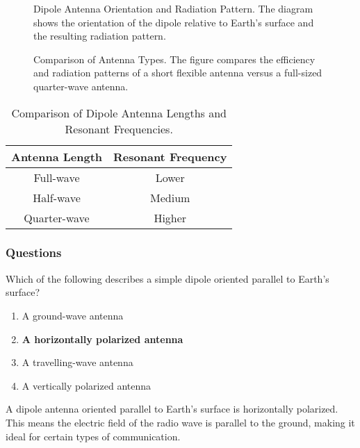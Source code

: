 \begin{figure}[h!]
    \centering
    \caption{Dipole Antenna Orientation and Radiation Pattern. The diagram shows the orientation of the dipole relative to Earth's surface and the resulting radiation pattern.}
    \label{fig:dipole-orientation}
\end{figure}

\begin{figure}[h!]
    \centering
    \caption{Comparison of Antenna Types. The figure compares the efficiency and radiation patterns of a short flexible antenna versus a full-sized quarter-wave antenna.}
    \label{fig:antenna-comparison}
\end{figure}

\begin{table}[h!]
    \centering
    \begin{tabular}{|c|c|}
        \hline
        \textbf{Antenna Length} & \textbf{Resonant Frequency} \\
        \hline
        Full-wave & Lower \\
        Half-wave & Medium \\
        Quarter-wave & Higher \\
        \hline
    \end{tabular}
    \caption{Comparison of Dipole Antenna Lengths and Resonant Frequencies.}
    \label{tab:dipole-lengths}
\end{table}

\subsubsection{Questions}

\begin{tcolorbox}[colback=gray!10!white,colframe=black!75!black,title={T9A03}]
    Which of the following describes a simple dipole oriented parallel to Earth's surface?
    \begin{enumerate}[label=\Alph*),noitemsep]
        \item A ground-wave antenna
        \item \textbf{A horizontally polarized antenna}
        \item A travelling-wave antenna
        \item A vertically polarized antenna
    \end{enumerate}
\end{tcolorbox}
A dipole antenna oriented parallel to Earth's surface is horizontally polarized. This means the electric field of the radio wave is parallel to the ground, making it ideal for certain types of communication.

